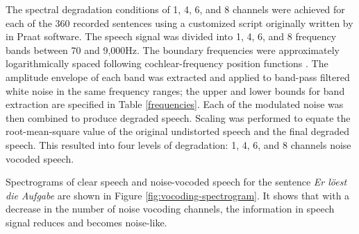 \documentclass[a4paper, nobind]{templates/ociamthesis}
\begin{document}
The spectral degradation conditions of 1, 4, 6, and 8 channels were achieved for each of the 360 recorded sentences using a customized script originally written by \textcite{Darwin2005} in Praat software.
The speech signal was divided into 1, 4, 6, and 8 frequency bands between 70 and 9,000Hz.
The boundary frequencies were approximately logarithmically spaced following cochlear-frequency position functions \autocite{Greenwood1990,Erb2014}.
The amplitude envelope of each band was extracted and applied to band-pass filtered white noise in the same frequency ranges;
the upper and lower bounds for band extraction are specified in Table \ref{frequencies}.
Each of the modulated noise was then combined to produce degraded speech.
Scaling was performed to equate the root-mean-square value of the original undistorted speech and the final degraded speech.
This resulted into four levels of degradation: 1, 4, 6, and 8 channels noise vocoded speech.

Spectrograms of clear speech and noise-vocoded speech for the sentence \emph{Er löest die Aufgabe} are shown in Figure \ref{fig:vocoding-spectrogram}. It shows that with a decrease in the number of noise vocoding channels, the information in speech signal reduces and becomes noise-like.
\end{document}
